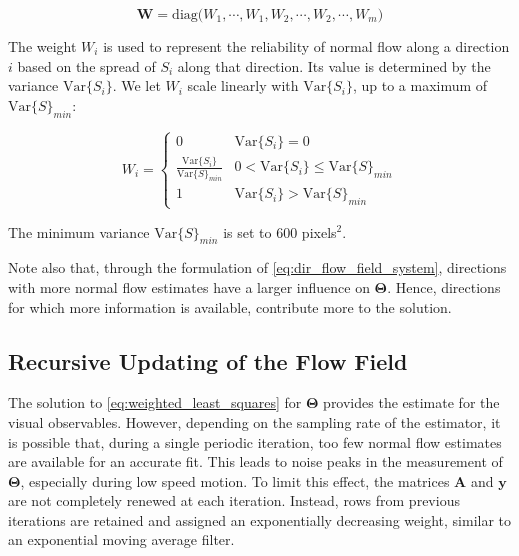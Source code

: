 \begin{equation}
\mathbf{W} = \mathrm{diag}\Big(W_1,\cdots,W_1,W_2,\cdots,W_2,\cdots, W_m\Big)
\end{equation}

The weight $W_i$ is used to represent the reliability of normal flow along a direction $i$ based on the spread of $S_i$ along that direction. Its value is determined by the variance $\mathrm{Var}\lbrace S_i\rbrace$. We let $W_i$ scale linearly with $\mathrm{Var}\lbrace S_i\rbrace$, up to a maximum of $\mathrm{Var}\lbrace S\rbrace_{min}$:

\begin{equation}
\label{eq:weight_variance}
{W_{i} = \left\{ {\begin{array}{*{20}{c}}
	0&{\mathrm{Var}\lbrace S_i\rbrace= 0}\\
	{\frac{\mathrm{Var}\lbrace S_i\rbrace}{\mathrm{Var}\lbrace S\rbrace_{min}}}&0<{{\mathrm{Var}\lbrace S_i\rbrace} \le {\mathrm{Var}\lbrace S\rbrace_{min}}}\\
	1&{{\mathrm{Var}\lbrace S_i\rbrace} > {\mathrm{Var}\lbrace S\rbrace_{min}}}
	\end{array}} \right.}
\end{equation}

The minimum variance $\mathrm{Var}\lbrace S\rbrace_{min}$ is set to 600 pixels$^2$. 

Note also that, through the formulation of \cref{eq:dir_flow_field_system}, directions with more normal flow estimates have a larger influence on $\mathbf{\Theta}$. Hence, directions for which more information is available, contribute more to the solution.

\subsection{Recursive Updating of the Flow Field}
\label{sec:vo_recursive}
The solution to \cref{eq:weighted_least_squares} for $\mathbf{\Theta}$ provides the estimate for the visual observables. However, depending on the sampling rate of the estimator, it is possible that, during a single periodic iteration, too few normal flow estimates are available for an accurate fit. This leads to noise peaks in the measurement of $\mathbf{\Theta}$, especially during low speed motion. To limit this effect, the matrices $\mathbf{A}$ and $\mathbf{y}$ are not completely renewed at each iteration. Instead, rows from previous iterations are retained and assigned an exponentially decreasing weight, similar to an exponential moving average filter.

